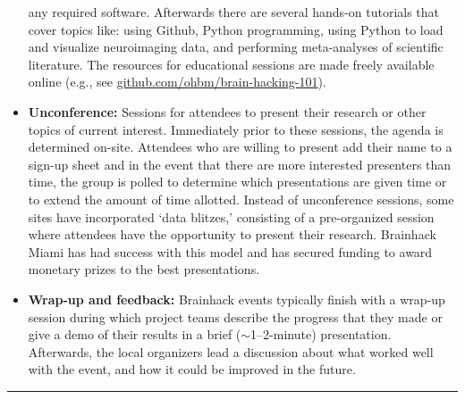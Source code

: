 \begin{table}[!ht]
\begin{itemize}
any required software. Afterwards there are several hands-on tutorials that cover topics like: using Github, Python programming, using Python to load and visualize neuroimaging data, and performing meta-analyses of scientific literature. The resources for educational sessions are made freely available online (e.g., see \href{https://github.com/ohbm/brain-hacking-101}{github.com/ohbm/brain-hacking-101}).
    \item
        \textbf{Unconference:} Sessions for attendees to present %
 their research or other topics of current interest. Immediately prior to these sessions, the agenda is determined on-site. Attendees who are willing to present add their name to a sign-up sheet and in the event that there are more interested presenters than time, the group is polled to determine which presentations are given time or to extend the amount of time allotted. Instead of unconference sessions, some sites have incorporated `data blitzes,' consisting of a pre-organized session where attendees have the opportunity to present their research. Brainhack Miami has had success with this model and has secured funding to award monetary prizes to the best presentations.
    \item
        \textbf{Wrap-up and feedback:} Brainhack events typically finish with a wrap-up session during which project teams describe the progress that they made or give a demo of their results in a brief ($\sim$1--2-minute) presentation. Afterwards, the local organizers lead a discussion about what worked well with the event, and how it could be improved in the future.
    \end{itemize}
\hrule %
\end{table}